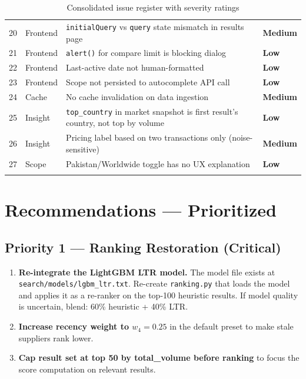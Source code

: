 \documentclass[12pt,a4paper]{article}
\newcommand{\cellWarn}[1]{\cellcolor{warningBg}\textcolor{zaraiAmber}{\textbf{#1}}}
\begin{document}
\begin{longtable}{clp{7cm}l}
20 & Frontend & \texttt{initialQuery} vs \texttt{query} state mismatch in results page & \cellWarn{Medium} \\
21 & Frontend & \texttt{alert()} for compare limit is blocking dialog & \cellWarn{Low} \\
22 & Frontend & Last-active date not human-formatted & \cellWarn{Low} \\
23 & Frontend & Scope not persisted to autocomplete API call & \cellWarn{Low} \\
24 & Cache & No cache invalidation on data ingestion & \cellWarn{Medium} \\
25 & Insight & \texttt{top\_country} in market snapshot is first result's country, not top by volume & \cellWarn{Low} \\
26 & Insight & Pricing label based on two transactions only (noise-sensitive) & \cellWarn{Medium} \\
27 & Scope & Pakistan/Worldwide toggle has no UX explanation & \cellWarn{Low} \\
\bottomrule
\caption{Consolidated issue register with severity ratings}
\end{longtable}

\section{Recommendations --- Prioritized}

\subsection{Priority 1 --- Ranking Restoration (Critical)}

\begin{enumerate}
  \item \textbf{Re-integrate the LightGBM LTR model.} The model file exists at
        \texttt{search/models/lgbm\_ltr.txt}. Re-create \texttt{ranking.py} that loads
        the model and applies it as a re-ranker on the top-100 heuristic results.
        If model quality is uncertain, blend: 60\% heuristic + 40\% LTR.
  \item \textbf{Increase recency weight to $w_4 = 0.25$} in the default preset to
        make stale suppliers rank lower.
  \item \textbf{Cap result set at top 50 by total\_volume before ranking} to focus
        the score computation on relevant results.
\end{enumerate}
\end{document}
